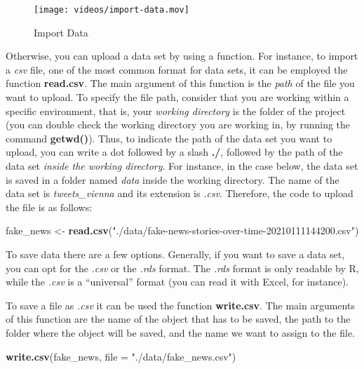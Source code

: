 \documentclass[
]{article}
\newenvironment{Shaded}{\begin{snugshade}}{\end{snugshade}}
\newcommand{\DataTypeTok}[1]{\textcolor[rgb]{0.13,0.29,0.53}{#1}}
\newcommand{\KeywordTok}[1]{\textcolor[rgb]{0.13,0.29,0.53}{\textbf{#1}}}
\newcommand{\NormalTok}[1]{#1}
\newcommand{\StringTok}[1]{\textcolor[rgb]{0.31,0.60,0.02}{#1}}
\begin{document}
\begin{figure}
\centering
\texttt{[image: videos/import-data.mov]}
\caption{Import Data}
\end{figure}

Otherwise, you can upload a data set by using a function. For instance, to import a \emph{csv} file, one of the most common format for data sets, it can be employed the function \textbf{read.csv}. The main argument of this function is the \emph{path} of the file you want to upload.
To specify the file path, consider that you are working within a specific environment, that is, your \emph{working directory} is the folder of the project (you can double check the working directory you are working in, by running the command \textbf{getwd()}). Thus, to indicate the path of the data set you want to upload, you can write a dot followed by a slash \textbf{./}, followed by the path of the data set \emph{inside the working directory}. For instance, in the case below, the data set is saved in a folder named \emph{data} inside the working directory. The name of the data set is \emph{tweets\_vienna} and its extension is \emph{.csv}. Therefore, the code to upload the file is as follows:

\begin{Shaded}
\begin{Highlighting}[]
\NormalTok{fake_news <-}\StringTok{ }\KeywordTok{read.csv}\NormalTok{(}\StringTok{"./data/fake-news-stories-over-time-20210111144200.csv"}\NormalTok{)}
\end{Highlighting}
\end{Shaded}

To save data there are a few options. Generally, if you want to save a data set, you can opt for the \emph{.csv} or the \emph{.rds} format. The \emph{.rds} format is only readable by R, while the \emph{.csv} is a ``universal'' format (you can read it with Excel, for instance).

To save a file as \emph{.csv} it can be used the function \textbf{write.csv}. The main arguments of this function are the name of the object that has to be saved, the path to the folder where the object will be saved, and the name we want to assign to the file.

\begin{Shaded}
\begin{Highlighting}[]
\KeywordTok{write.csv}\NormalTok{(fake_news, }\DataTypeTok{file =} \StringTok{"./data/fake_news.csv"}\NormalTok{)}
\end{Highlighting}
\end{Shaded}
\end{document}
